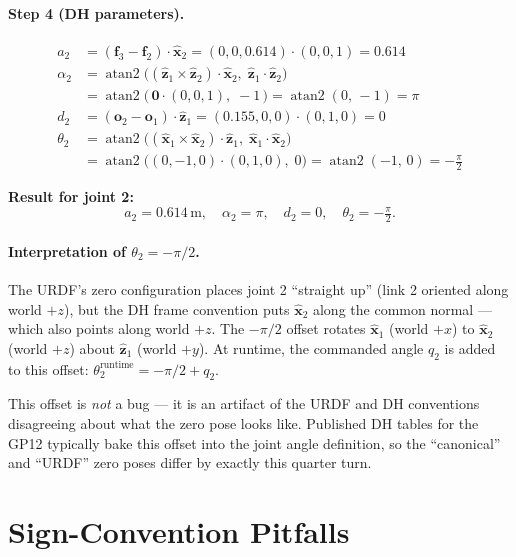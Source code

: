 \documentclass[11pt]{article}
\newcommand{\vect}[1]{\bm{#1}}
\newcommand{\unit}[1]{\hat{\bm{#1}}}
\newcommand{\atantwo}{\operatorname{atan2}}
\begin{document}
\paragraph{Step 4 (DH parameters).}
\begin{align*}
  a_2 &= (\vect{f}_3 - \vect{f}_2) \cdot \unit{x}_2
       = (0, 0, 0.614) \cdot (0, 0, 1) = 0.614 \\[4pt]
  \alpha_2 &= \atantwo\bigl((\unit{z}_1 \times \unit{z}_2) \cdot \unit{x}_2,\;
                              \unit{z}_1 \cdot \unit{z}_2\bigr) \\
           &= \atantwo\bigl(\,\vect{0} \cdot (0,0,1),\; -1\,\bigr)
            = \atantwo(0,\, -1) = \pi \\[4pt]
  d_2 &= (\vect{o}_2 - \vect{o}_1) \cdot \unit{z}_1
       = (0.155, 0, 0) \cdot (0, 1, 0) = 0 \\[4pt]
  \theta_2 &= \atantwo\bigl((\unit{x}_1 \times \unit{x}_2) \cdot \unit{z}_1,\;
                              \unit{x}_1 \cdot \unit{x}_2\bigr) \\
           &= \atantwo\bigl((0, -1, 0) \cdot (0, 1, 0),\; 0\bigr)
            = \atantwo(-1,\, 0) = -\tfrac{\pi}{2}
\end{align*}

\begin{keybox}
\textbf{Result for joint 2:}
\[
  a_2 = 0.614\,\text{m}, \quad
  \alpha_2 = \pi, \quad
  d_2 = 0, \quad
  \theta_2 = -\tfrac{\pi}{2}.
\]
\end{keybox}

\paragraph{Interpretation of $\theta_2 = -\pi/2$.} The URDF's zero
configuration places joint 2 ``straight up'' (link 2 oriented along world
$+z$), but the DH frame convention puts $\unit{x}_2$ along the common
normal --- which also points along world $+z$. The $-\pi/2$ offset rotates
$\unit{x}_1$ (world $+x$) to $\unit{x}_2$ (world $+z$) about $\unit{z}_1$
(world $+y$). At runtime, the commanded angle $q_2$ is added to this
offset: $\theta_2^{\mathrm{runtime}} = -\pi/2 + q_2$.

This offset is \emph{not} a bug --- it is an artifact of the URDF and DH
conventions disagreeing about what the zero pose looks like. Published DH
tables for the GP12 typically bake this offset into the joint angle
definition, so the ``canonical'' and ``URDF'' zero poses differ by exactly
this quarter turn.

\section{Sign-Convention Pitfalls}
\end{document}
